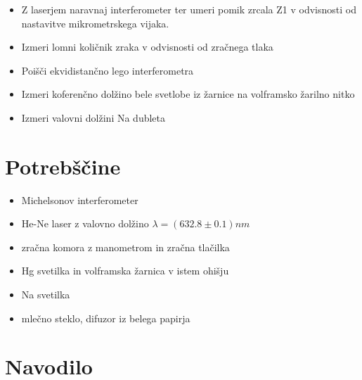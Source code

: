 \documentclass[12pt]{report}
\begin{document}
\begin{itemize}
  \item Z laserjem naravnaj interferometer ter umeri pomik zrcala Z1 v odvisnosti od nastavitve mikrometrskega vijaka. 
  \item Izmeri lomni količnik zraka v odvisnosti od zračnega tlaka
  \item Poišči ekvidistančno lego interferometra
  \item Izmeri koferenčno dolžino bele svetlobe iz žarnice na volframsko žarilno nitko 
  \item Izmeri valovni dolžini Na dubleta
\end{itemize}


\begingroup
\let\clearpage\relax

\chapter*{Potrebščine}
\begin{itemize}
  \item Michelsonov interferometer 
  \item He-Ne laser z valovno dolžino $\lambda = (632.8 \pm 0.1)nm$
  \item zračna komora z manometrom in zračna tlačilka 
  \item Hg svetilka in volframska žarnica v istem ohišju
  \item Na svetilka
  \item mlečno steklo, difuzor iz belega papirja
\end{itemize}

\chapter*{Navodilo}
\end{document}
